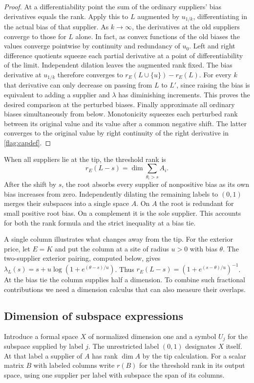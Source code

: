 \begin{proof}
At a differentiability point the sum of the ordinary suppliers' bias
derivatives equals the rank. Apply this to $L$ augmented by $u_{1/k}$,
differentiating in the actual bias of that supplier. As $k\to\infty$,
the derivatives at the old suppliers converge to those for $L$ alone.
In fact, as convex functions of the old biases the values converge
pointwise by continuity and redundancy of $u_0$. Left and right
difference quotients squeeze each partial derivative at a point of
differentiability of the limit. Independent dilation leaves the
augmented rank fixed. The bias derivative at $u_{1/k}$ therefore
converges to $r_E(L\cup\{u\})-r_E(L)$.
For every $k$ that derivative can only decrease on passing from $L$ to
$L'$, since raising the bias is equivalent to adding a supplier and
$\lambda$ has diminishing increments. This proves the desired comparison
at the perturbed biases. Finally approximate all ordinary biases
simultaneously from below. Monotonicity squeezes each perturbed rank
between its original value and its value after a common negative shift.
The latter converges to the original value by right continuity of the
right derivative in \eqref{flag:capdef}.
\end{proof}

When all suppliers lie at the tip, the threshold rank is
\[
 r_E(L-s)=\dim\!\sum_{\theta_i>s} A_i .
\]
After the shift by $s$, the root absorbs every supplier of nonpositive
bias as its own bias increases from zero. Independently dilating the
remaining labels to $(0,1)$ merges their subspaces into a single space
$A$. On $A$ the root is redundant for small positive root bias. On a
complement it is the sole supplier. This accounts for both the rank
formula and the strict inequality at a bias tie.

A single column illustrates what changes away from the tip. For the
exterior price, let $E=K$ and put the column at a site of radius $u>0$
with bias $\theta$. The two-supplier exterior pairing, computed below,
gives $\lambda_L(s)=s+u\log(1+e^{(\theta-s)/u})$. Thus
$r_E(L-s)=(1+e^{(s-\theta)/u})^{-1}$. At the bias tie the column
supplies half a dimension. To combine such fractional contributions
we need a dimension calculus that can also measure their overlaps.

\subsection{Dimension of subspace expressions}

Introduce a formal space $X$ of normalized dimension one and a symbol
$U_j$ for the subspace supplied by label $j$. The unrestricted label $(0,1)$
designates $X$ itself. At that label a supplier of $A$ has rank
$\dim A$ by the tip calculation. For a scalar matrix $B$ with labeled
columns write $r(B)$ for the threshold rank in its output space, using
one supplier per label with subspace the span of its columns.

